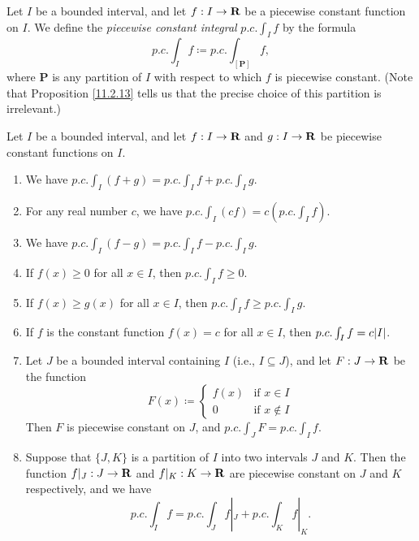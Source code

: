 \begin{definition}\label{11.2.14}
    Let \(I\) be a bounded interval, and let \(f : I \to \mathbf{R}\) be a piecewise constant function on \(I\).
    We define the \emph{piecewise constant integral} \(p.c. \int_I f\) by the formula
    \[
        p.c. \int_I f \coloneqq p.c. \int_{[\mathbf{P}]} f,
    \]
    where \(\mathbf{P}\) is any partition of \(I\) with respect to which \(f\) is piecewise constant.
    (Note that Proposition \ref{11.2.13} tells us that the precise choice of this partition is irrelevant.)
\end{definition}

\setcounter{theorem}{15}
\begin{theorem}\label{11.2.16}
    Let \(I\) be a bounded interval, and let \(f : I \to \mathbf{R}\) and \(g : I \to \mathbf{R}\) be piecewise constant functions on \(I\).
    \begin{enumerate}
        \item We have \(p.c. \int_I (f + g) = p.c. \int_I f + p.c. \int_I g\).
        \item For any real number \(c\), we have \(p.c. \int_I (cf) = c (p.c. \int_I f)\).
        \item We have \(p.c. \int_I (f - g) = p.c. \int_I f - p.c. \int_I g\).
        \item If \(f(x) \geq 0\) for all \(x \in I\), then \(p.c. \int_I f \geq 0\).
        \item If \(f(x) \geq g(x)\) for all \(x \in I\), then \(p.c. \int_I f \geq p.c. \int_I g\).
        \item If \(f\) is the constant function \(f(x) = c\) for all \(x \in I\), then \(p.c. \int_I f = c \abs{I}\).
        \item Let \(J\) be a bounded interval containing \(I\) (i.e., \(I \subseteq J\)), and let \(F : J \to \mathbf{R}\) be the function
              \[
                  F(x) \coloneqq \begin{cases}
                      f(x) & \text{if } x \in I    \\
                      0    & \text{if } x \notin I
                  \end{cases}
              \]
              Then \(F\) is piecewise constant on \(J\), and \(p.c. \int_J F = p.c. \int_I f\).
        \item Suppose that \(\{J, K\}\) is a partition of \(I\) into two intervals \(J\) and \(K\).
              Then the function \(f|_J : J \to \mathbf{R}\) and \(f|_K : K \to \mathbf{R}\) are piecewise constant on \(J\) and \(K\) respectively, and we have
              \[
                  p.c. \int_I f = p.c. \int_J f|_J + p.c. \int_K f|_K.
              \]
    \end{enumerate}
\end{theorem}

